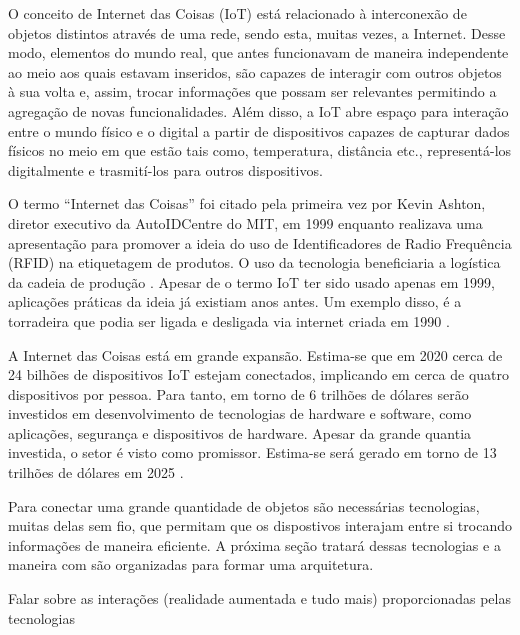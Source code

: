 \documentclass[
	article,			%
	11pt,				%
	oneside,			%
	a4paper,			%
	section=TITLE,		%
	subsection=TITLE,	%
	english,			%
	brazil,				%
	sumario=tradicional
	]{abntex2}
\begin{document}

O conceito de Internet das Coisas (IoT) está relacionado à interconexão de objetos distintos 
através de uma rede, sendo esta, muitas vezes, a Internet. Desse modo, elementos do mundo real, que 
antes funcionavam de maneira independente ao meio aos quais estavam inseridos, são capazes de 
interagir com outros objetos à sua volta e, assim, trocar informações que possam ser relevantes 
permitindo a agregação de novas funcionalidades.  Além disso, a IoT abre espaço para interação 
entre o mundo físico e o digital a partir de dispositivos capazes de capturar dados físicos no meio 
em que estão tais como, temperatura, distância etc., representá-los digitalmente e trasmití-los 
para outros dispositivos.

	
O termo ``Internet das Coisas'' foi citado pela primeira vez por Kevin Ashton, diretor executivo da 
AutoIDCentre do MIT, em 1999 enquanto realizava uma apresentação para promover a ideia do uso de 
Identificadores de Radio Frequência (RFID) na etiquetagem de produtos. O uso da tecnologia 
beneficiaria a logística da cadeia de produção \cite{kevin-ashton}. Apesar de o termo IoT ter sido 
usado apenas em 1999, aplicações práticas da ideia já existiam anos antes. Um exemplo disso, é a 
torradeira que podia ser ligada e desligada via internet criada em 1990 \cite{survey-suresh}.




A Internet das Coisas está em grande expansão. Estima-se que em 2020 cerca de 24 bilhões de 
dispositivos IoT estejam conectados, implicando em cerca de quatro dispositivos por pessoa. Para 
tanto, em torno de 6 trilhões de dólares serão investidos em desenvolvimento de tecnologias de 
hardware e software, como aplicações, segurança e dispositivos de hardware. Apesar da grande 
quantia investida, o setor é visto como promissor. Estima-se será gerado em torno de 13 trilhões de 
dólares 
em 2025 \cite{andrewmeola2016}. 

Para conectar uma grande quantidade de objetos são necessárias tecnologias, muitas delas sem fio, 
que permitam que os dispostivos interajam entre si trocando informações de maneira eficiente. A 
próxima seção tratará dessas tecnologias e a maneira com são organizadas para formar uma 
arquitetura. 

Falar sobre as interações (realidade aumentada e tudo mais) proporcionadas 
pelas tecnologias
\end{document}
